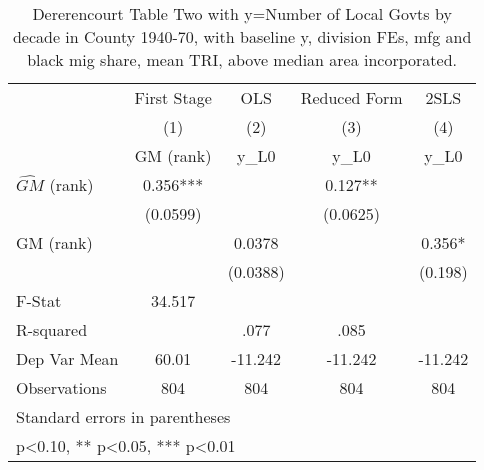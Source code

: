 \begin{table}[htbp]\centering
\def\sym#1{\ifmmode^{#1}\else\(^{#1}\)\fi}
\caption{Dererencourt Table Two with y=Number of Local Govts by decade in County 1940-70, with baseline y, division FEs, mfg and black mig share, mean TRI, above median area incorporated.}
\begin{tabular}{l*{4}{c}}
\toprule
                    & First Stage   &         OLS   &Reduced Form   &        2SLS   \\
                    &\multicolumn{1}{c}{(1)}&\multicolumn{1}{c}{(2)}&\multicolumn{1}{c}{(3)}&\multicolumn{1}{c}{(4)}\\
                    &\multicolumn{1}{c}{GM  (rank)}&\multicolumn{1}{c}{y\_L0}&\multicolumn{1}{c}{y\_L0}&\multicolumn{1}{c}{y\_L0}\\
\midrule
$\hat{GM}$ (rank)   &       0.356***&               &       0.127** &               \\
                    &    (0.0599)   &               &    (0.0625)   &               \\
\addlinespace
GM  (rank)          &               &      0.0378   &               &       0.356*  \\
                    &               &    (0.0388)   &               &     (0.198)   \\
\midrule
F-Stat              &      34.517   &               &               &               \\
R-squared           &               &        .077   &        .085   &               \\
Dep Var Mean        &       60.01   &     -11.242   &     -11.242   &     -11.242   \\
Observations        &         804   &         804   &         804   &         804   \\
\bottomrule
\multicolumn{5}{l}{\footnotesize Standard errors in parentheses}\\
\multicolumn{5}{l}{\footnotesize * p<0.10, ** p<0.05, *** p<0.01}\\
\end{tabular}
\end{table}
